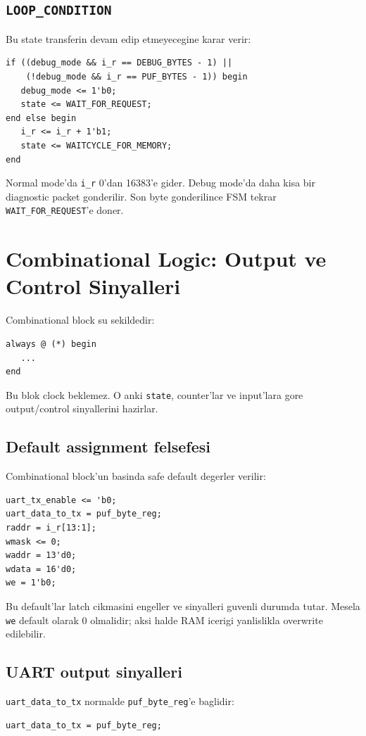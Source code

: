 \documentclass[11pt,a4paper]{article}
\begin{document}
\subsection{\texttt{LOOP\_CONDITION}}
Bu state transferin devam edip etmeyecegine karar verir:
\begin{lstlisting}[style=verilogstyle]
if ((debug_mode && i_r == DEBUG_BYTES - 1) ||
    (!debug_mode && i_r == PUF_BYTES - 1)) begin
   debug_mode <= 1'b0;
   state <= WAIT_FOR_REQUEST;
end else begin
   i_r <= i_r + 1'b1;
   state <= WAITCYCLE_FOR_MEMORY;
end
\end{lstlisting}

Normal mode'da \texttt{i\_r} 0'dan 16383'e gider. Debug mode'da daha kisa bir diagnostic packet gonderilir. Son byte gonderilince FSM tekrar \texttt{WAIT\_FOR\_REQUEST}'e doner.

\section{Combinational Logic: Output ve Control Sinyalleri}

Combinational block su sekildedir:
\begin{lstlisting}[style=verilogstyle]
always @ (*) begin
   ...
end
\end{lstlisting}

Bu blok clock beklemez. O anki \texttt{state}, counter'lar ve input'lara gore output/control sinyallerini hazirlar.

\subsection{Default assignment felsefesi}
Combinational block'un basinda safe default degerler verilir:
\begin{lstlisting}[style=verilogstyle]
uart_tx_enable <= 'b0;
uart_data_to_tx = puf_byte_reg;
raddr = i_r[13:1];
wmask <= 0;
waddr = 13'd0;
wdata = 16'd0;
we = 1'b0;
\end{lstlisting}

Bu default'lar latch cikmasini engeller ve sinyalleri guvenli durumda tutar. Mesela \texttt{we} default olarak 0 olmalidir; aksi halde RAM icerigi yanlislikla overwrite edilebilir.

\subsection{UART output sinyalleri}
\texttt{uart\_data\_to\_tx} normalde \texttt{puf\_byte\_reg}'e baglidir:
\begin{lstlisting}[style=verilogstyle]
uart_data_to_tx = puf_byte_reg;
\end{lstlisting}
\end{document}

